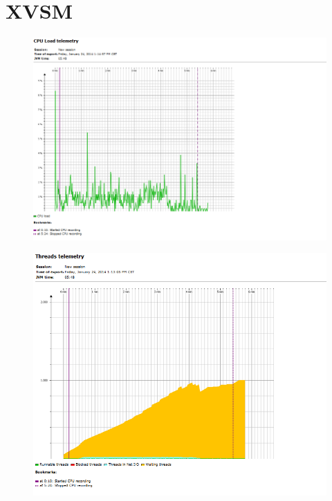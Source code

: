 \documentclass[a4paper,12pt]{scrreprt}
\begin{document}
\pagebreak
\section{XVSM}
\begin{figure}[h]
\centering
\includegraphics[width=0.6\linewidth]{./CPU_XVSM}
\caption{}
\label{fig:CPU_XVSM}
\end{figure}
\begin{figure}[h]
\centering
\includegraphics[width=0.6\linewidth]{./Thread_XVSM}
\caption{}
\label{fig:Thread_XVSM}
\end{figure}
\end{document}
